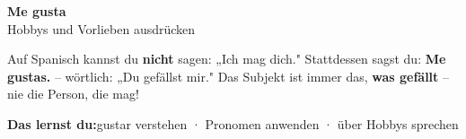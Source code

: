 \documentclass[10pt, a4paper]{article}
\newcommand{\seriftext}[1]{{\fontfamily{ppl}\selectfont #1}}
\newcommand{\thema}{Me gusta}
\newcommand{\untertitel}{Hobbys und Vorlieben ausdrücken}
\newcommand{\lernziele}{gustar verstehen · Pronomen anwenden · über Hobbys sprechen}
\newcommand{\es}[1]{\seriftext{\textbf{#1}}}
\begin{document}
\begin{center}
    {\LARGE\bfseries \thema}\\[3pt]
    {\small \untertitel}
\end{center}

\vspace{2pt}

Auf Spanisch kannst du \textbf{nicht} sagen: „Ich mag dich." Stattdessen sagst du: \es{Me gustas.} -- wörtlich: „Du gefällst mir." Das Subjekt ist immer das, \textbf{was gefällt} -- nie die Person, die mag!

\vspace{2pt}

\begin{lernzielbox}
\textbf{Das lernst du:}\quad \lernziele
\end{lernzielbox}

\end{document}
